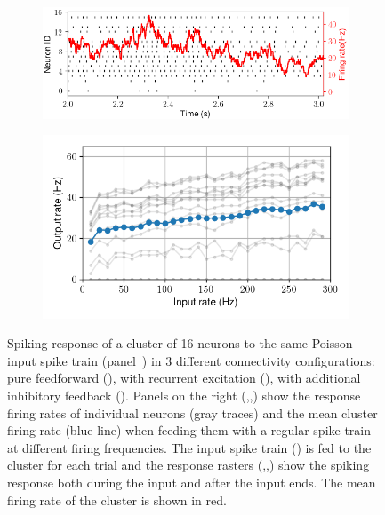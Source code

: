 \begin{figure}[h!]
\begin{subfigure}{.1\textwidth}
  \end{subfigure}
    \hfill
  \begin{subfigure}{.5\textwidth}
    \centering
    \includegraphics[width=\textwidth]{img/chapter4/raster_fb.png}
    \caption{}
    \label{fig:single_cluster_feedback_raster}
  \end{subfigure}
        \hfill
  \begin{subfigure}{.3\textwidth}
    \centering
    \includegraphics[width=\textwidth]{img/chapter4/EI_FF_curves.png}
      \caption{}
      \label{fig:single_cluster_feedback_ff_curves}
  \end{subfigure}
  \caption[EI coupling of a single cluster of neurons. Spiking activity decorrelation.]{Spiking response of a cluster of 16 neurons to the same Poisson input spike train (panel~) in 3 different connectivity configurations: pure feedforward (), with recurrent excitation (), with additional inhibitory feedback ().
Panels on the right (,,) show the response firing rates of individual neurons (gray traces) and the mean cluster firing rate (blue line) when feeding them with a regular spike train at different firing frequencies.
  The input spike train () is fed to the cluster for each trial and the response rasters (,,) show the spiking response both during the input and after the input ends.
The mean firing rate of the cluster is shown in red.}
  \label{fig:single_cluster_variability}
\end{figure}


